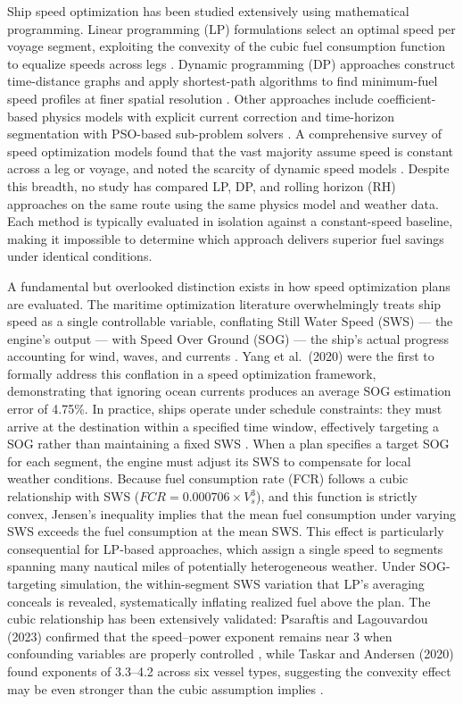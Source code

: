 \documentclass[review]{elsarticle}
\begin{document}
Ship speed optimization has been studied extensively using mathematical programming. Linear programming (LP) formulations select an optimal speed per voyage segment, exploiting the convexity of the cubic fuel consumption function to equalize speeds across legs \cite{Fagerholt2010,Norstad2011}. Dynamic programming (DP) approaches construct time-distance graphs and apply shortest-path algorithms to find minimum-fuel speed profiles at finer spatial resolution \cite{Zaccone2018}. Other approaches include coefficient-based physics models with explicit current correction \cite{Yang2020} and time-horizon segmentation with PSO-based sub-problem solvers \cite{Tzortzis2021}. A comprehensive survey of speed optimization models found that the vast majority assume speed is constant across a leg or voyage, and noted the scarcity of dynamic speed models \cite{Psaraftis2013}. Despite this breadth, no study has compared LP, DP, and rolling horizon (RH) approaches on the same route using the same physics model and weather data. Each method is typically evaluated in isolation against a constant-speed baseline, making it impossible to determine which approach delivers superior fuel savings under identical conditions.

A fundamental but overlooked distinction exists in how speed optimization plans are evaluated. The maritime optimization literature overwhelmingly treats ship speed as a single controllable variable, conflating Still Water Speed (SWS) --- the engine's output --- with Speed Over Ground (SOG) --- the ship's actual progress accounting for wind, waves, and currents \cite{Yang2020}. Yang et al.\ (2020) were the first to formally address this conflation in a speed optimization framework, demonstrating that ignoring ocean currents produces an average SOG estimation error of 4.75\%. In practice, ships operate under schedule constraints: they must arrive at the destination within a specified time window, effectively targeting a SOG rather than maintaining a fixed SWS \cite{Jia2017,Huotari2021}. When a plan specifies a target SOG for each segment, the engine must adjust its SWS to compensate for local weather conditions. Because fuel consumption rate (FCR) follows a cubic relationship with SWS ($FCR = 0.000706 \times V_s^3$), and this function is strictly convex, Jensen's inequality implies that the mean fuel consumption under varying SWS exceeds the fuel consumption at the mean SWS. This effect is particularly consequential for LP-based approaches, which assign a single speed to segments spanning many nautical miles of potentially heterogeneous weather. Under SOG-targeting simulation, the within-segment SWS variation that LP's averaging conceals is revealed, systematically inflating realized fuel above the plan. The cubic relationship has been extensively validated: Psaraftis and Lagouvardou (2023) confirmed that the speed--power exponent remains near 3 when confounding variables are properly controlled \cite{Psaraftis2023}, while Taskar and Andersen (2020) found exponents of 3.3--4.2 across six vessel types, suggesting the convexity effect may be even stronger than the cubic assumption implies \cite{Taskar2020}.
\end{document}
